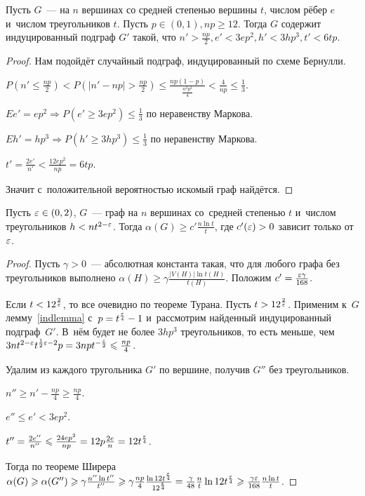 \documentclass{article}
\begin{document}
\begin{lemma}\label{indlemma}
	Пусть $G$~--- на $n$ вершинах со средней степенью вершины $t$, числом рёбер
	$e$ и~числом треугольников $t$. Пусть $p \in (0, 1), np \ge 12$. Тогда $G$
	содержит индуцированный подграф $G'$ такой, что $n' > \frac{np}{2}, e' <
	3ep^2, h' < 3hp^3, t' < 6tp$.
\end{lemma}
\begin{proof}
	Нам подойдёт случайный подграф, индуцированный по схеме Бернулли.

	$P\left(n' \le \frac{np}{2}\right) < P\left(|n' - np| > \frac{np}{2}\right)
	\le \frac{np(1-p)}{\frac{n^2p^2}{4}} < \frac{4}{np} \le \frac{1}{3}$.

	$Ee' = ep^2 \Rightarrow P(e' \ge 3ep^2) \le \frac{1}{3}$ по неравенству
	Маркова.

	$Eh' = hp^3 \Rightarrow P(h' \ge 3hp^3) \le \frac{1}{3}$ по неравенству
	Маркова.

	$t' = \frac{2e'}{n'} < \frac{12ep^2}{np} = 6tp$.

	Значит с~положительной вероятностью искомый граф найдётся.
\end{proof}

\begin{lemma}\label{slemm}
	Пусть $\varepsilon \in (0, 2)$, $G$~--- граф на $n$ вершинах со~средней степенью $t$
	и~числом треугольников $h < n t^{2-\varepsilon}$. Тогда $\alpha(G) \ge c' \frac{n \ln
	t}{t}$, где $c'(\varepsilon) > 0$ зависит только от $\varepsilon$.
\end{lemma}
\begin{proof}
	Пусть $\gamma > 0$~--- абсолютная константа такая, что для любого графа без
	треугольников выполнено $\alpha(H) \ge \gamma \frac{|V(H)| \ln t(H)}{t(H)}$.
	Положим $c' = \frac{\varepsilon \gamma}{168}$.

	Если $t < 12^\frac{2}{\varepsilon}$, то все очевидно по теореме Турана. Пусть $t >
	12^\frac{2}{\varepsilon}$. Применим к~$G$ лемму~\ref{indlemma} с~$p =
	t^\frac{\varepsilon}{4} - 1$ и~рассмотрим найденный индуцированный подграф~$G'$.
	В~нём будет не более $3hp^3$ треугольников, то есть меньше, чем $3nt^{2-\varepsilon}
	t^{\frac{1}{2}\varepsilon - 2} p = 3np t^{-\frac{\varepsilon}{2}} \leqslant \frac{np}{4}$.

	Удалим из каждого тругольника $G'$ по вершине, получив $G''$ без
	треугольников.

	$n'' \ge n' - \frac{np}{4} \ge \frac{np}{4}$.

	$e'' \le e' < 3ep^2$.

	$t'' = \frac{2e''}{n''} \leqslant \frac{24 ep^2}{np} = 12p \frac{2e}{n} =
	12t^\frac{\varepsilon}{4}$.

	Тогда по теореме Ширера $\alpha(G) \geqslant \alpha(G'') \geqslant \gamma \frac{n'' \ln
	t''}{t''} \geqslant \gamma \frac{np}{4} \frac{\ln 12
	t^\frac{\varepsilon}{4}}{12^\frac{\varepsilon}{4}} = \frac{\gamma}{48} \frac{n}{t} \ln
	12t^\frac{\varepsilon}{4} \geqslant \frac{\gamma \varepsilon}{168} \frac{n \ln t}{t}$.
\end{proof}
\end{document}
